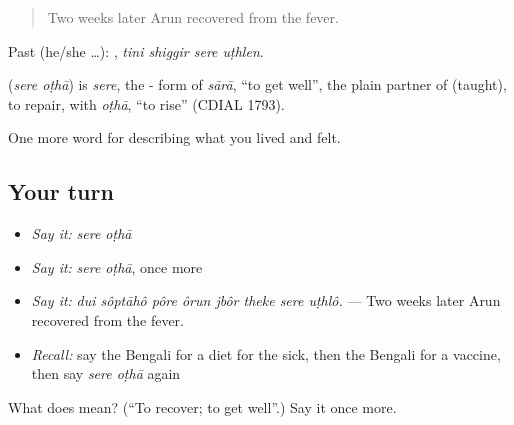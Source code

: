 \begin{quote}
Two weeks later Arun recovered from the fever.
\end{quote}

Past (he/she …):    , \emph{tini shiggir sere uṭhlen}.

\begin{cousinweb}
\textbf{ } (\emph{sere oṭhā}) is \emph{sere}, the - form of \emph{sārā}, \textquotedblleft{}to get well\textquotedblright{}, the plain partner of  (taught), to repair, with \emph{oṭhā}, \textquotedblleft{}to rise\textquotedblright{} (CDIAL 1793).
\end{cousinweb}

\begin{grammarlens}[title={What you've built}]
One more word for describing what you lived and felt.
\end{grammarlens}

\subsection*{Your turn}
\begin{itemize}
\raggedright
  \item \emph{Say it:} \emph{sere oṭhā}
  \item \emph{Say it:} \emph{sere oṭhā}, once more
  \item \emph{Say it:} \emph{dui sôptāhô pôre ôrun jbôr theke sere uṭhlô.} — Two weeks later Arun recovered from the fever.
  \item \emph{Recall:} say the Bengali for a diet for the sick, then the Bengali for a vaccine, then say \emph{sere oṭhā} again
\end{itemize}

\begin{tcolorbox}[breakable,colback=teal!4,colframe=teal!35!black,title={Before you move on}]
What does   mean? (\textquotedblleft{}To recover; to get well\textquotedblright{}.) Say it once more.
\end{tcolorbox}
